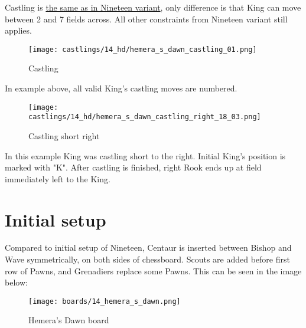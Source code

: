 Castling is
\hyperref[sec:Nineteen/Castling]{the same as in Nineteen variant},
only difference is that King can move
between 2 and 7 fields across. All other constraints from Nineteen variant still
applies.

\noindent
\begin{figure}[!h]
\texttt{[image: castlings/14\_hd/hemera\_s\_dawn\_castling\_01.png]}
\caption{Castling}
\label{fig:hemera_s_dawn_castling_01}
\end{figure}

In example above, all valid King's castling moves are numbered.

\noindent
\begin{figure}[!h]
\texttt{[image: castlings/14\_hd/hemera\_s\_dawn\_castling\_right\_18\_03.png]}
\caption{Castling short right}
\label{fig:hemera_s_dawn_castling_right_18_03}
\end{figure}

In this example King was castling short to the right. Initial King's position is
marked with "K". After castling is finished, right Rook ends up at field immediately
left to the King.

\clearpage %

\section*{Initial setup}
\label{sec:Hemera's Dawn/Initial setup}

Compared to initial setup of Nineteen, Centaur is inserted between Bishop and Wave
symmetrically, on both sides of chessboard. Scouts are added before first row of Pawns,
and Grenadiers replace some Pawns. This can be seen in the image below:

\noindent
\begin{figure}[h]
\texttt{[image: boards/14\_hemera\_s\_dawn.png]}
\caption{Hemera's Dawn board}
\label{fig:14_hemera_s_dawn}
\end{figure}

\clearpage %
